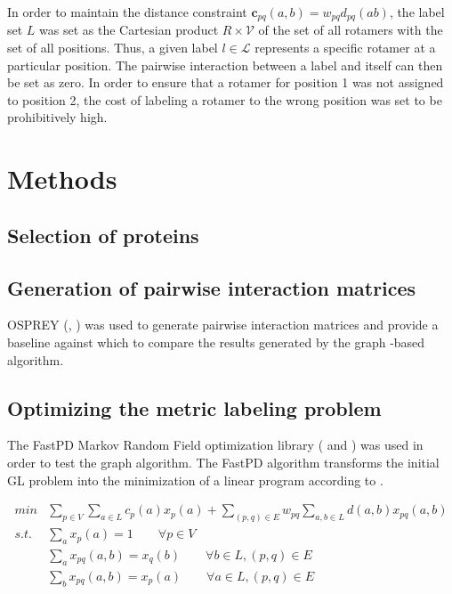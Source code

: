 \documentclass[11pt]{article}
\begin{document}
	In order to maintain the distance constraint 
	$\textbf{c}_{pq}(a,b) =  w_{pq}d_{pq}(ab)$, the label set $L$ was set as the
	Cartesian product $R \times \mathcal{V}$ of the set of all rotamers with the set
	of all positions. Thus, a given label $l \in \mathcal{L}$ represents a specific
	rotamer at a particular position. The pairwise interaction between a label and
	itself can then be set as zero. In order to ensure that a rotamer for position 1
	was not assigned to position 2, the cost of labeling a rotamer to the wrong
	position was set to be prohibitively high. 
	
	\section{Methods}
	\subsection{Selection of proteins}
	\subsection{Generation of pairwise interaction matrices}
	OSPREY (\cite{OS1}, \cite{OS2}) was used to generate pairwise interaction matrices
	and provide a baseline against which to compare the results generated by the graph
	-based algorithm.
	
	\subsection{Optimizing the metric labeling problem}
	The FastPD Markov Random Field optimization library 
	(\cite{Karmarkar} and \cite{Komodakis}) was used in order to test the graph
	algorithm. The FastPD algorithm transforms the initial GL problem into the
	minimization of a linear program according to \cite{CKNZ}. 
	
	\begin{equation}
		\begin{split}
		min & \sum_{p \in V} \sum_{a\in L} c_p(a)x_p(a)+ \sum_{(p,q) \in E} w_{pq}
		 \sum_{a,b \in L}d(a,b) x_{pq}(a,b)\\
		s.t. & \sum_a x_p(a) =1 \qquad \forall p \in V\\
		& \sum_a x_{pq}(a,b)=x_q(b) \qquad \forall b \in L, (p,q) \in E\\
		& \sum_b x_{pq}(a,b)=x_p(a) \qquad \forall a \in L, (p,q) \in E
		\end{split}
	\label{linear}
	\end{equation}
	
\end{document}
